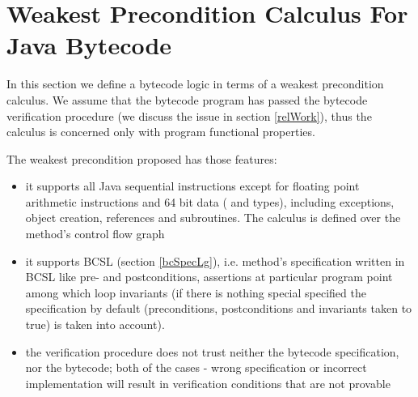 
\section{Weakest Precondition Calculus For Java Bytecode}\label{wpbc}
In this section we define a bytecode logic in terms of a weakest precondition calculus.
We assume that the bytecode program has passed the bytecode verification procedure (we discuss the issue in section \ref{relWork}), thus the calculus is concerned only with 
 program functional properties. 

The weakest precondition proposed has those features:
\begin{itemize}
\item it supports all Java sequential instructions except for floating point arithmetic instructions and 64 bit data ( and  types), including 
exceptions, object creation, references and subroutines. The calculus is defined over the method's control flow graph

\item it supports BCSL (section \ref{bcSpecLg}), i.e. method's specification written in BCSL like pre- and postconditions, assertions at particular program point among 
which loop invariants (if there is nothing special specified the specification by default (preconditions, postconditions and invariants taken to true) is taken into account). %
\item the verification procedure does not trust neither the bytecode specification, nor the bytecode; both of the cases - wrong 
specification or incorrect implementation will result in verification conditions that are not provable 
\end{itemize}


